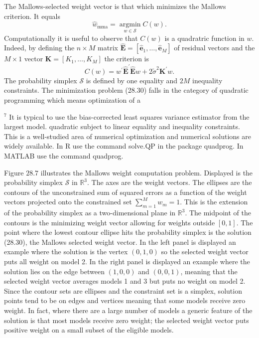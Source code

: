 \documentclass[10pt]{article}
\begin{document}
The Mallows-selected weight vector is that which minimizes the Mallows criterion. It equals
$$
\widehat{w}_{\mathrm{mma}}=\underset{w \in \mathscr{S}}{\operatorname{argmin}} C(w) .
$$
Computationally it is useful to observe that $C(w)$ is a quadratric function in $w$. Indeed, by defining the $n \times M$ matrix $\widehat{\boldsymbol{E}}=\left[\widehat{\boldsymbol{e}}_{1}, \ldots, \widehat{\boldsymbol{e}}_{M}\right]$ of residual vectors and the $M \times 1$ vector $\boldsymbol{K}=\left[K_{1}, \ldots, K_{M}\right]$ the criterion is
$$
C(w)=w^{\prime} \widehat{\boldsymbol{E}}^{\prime} \widehat{\boldsymbol{E}} w+2 \widetilde{\sigma}^{2} \boldsymbol{K}^{\prime} w .
$$
The probability simplex $\mathscr{S}$ is defined by one equality and $2 M$ inequality constraints. The minimization problem (28.30) falls in the category of quadratic programming which means optimization of a

${ }^{7}$ It is typical to use the bias-corrected least squares variance estimator from the largest model. quadratic subject to linear equality and inequality constraints. This is a well-studied area of numerical optimization and numerical solutions are widely available. In R use the command solve.QP in the package quadprog. In MATLAB use the command quadprog.

Figure $28.7$ illustrates the Mallows weight computation problem. Displayed is the probability simplex $\mathscr{S}$ in $\mathbb{R}^{3}$. The axes are the weight vectors. The ellipses are the contours of the unconstrained sum of squared errors as a function of the weight vectors projected onto the constrained set $\sum_{m=1}^{M} w_{m}=1$. This is the extension of the probability simplex as a two-dimensional plane in $\mathbb{R}^{3}$. The midpoint of the contours is the minimizing weight vector allowing for weights outside $[0,1]$. The point where the lowest contour ellipse hits the probability simplex is the solution (28.30), the Mallows selected weight vector. In the left panel is displayed an example where the solution is the vertex $(0,1,0)$ so the selected weight vector puts all weight on model 2. In the right panel is displayed an example where the solution lies on the edge between $(1,0,0)$ and $(0,0,1)$, meaning that the selected weight vector averages models 1 and 3 but puts no weight on model 2. Since the contour sets are ellipses and the constraint set is a simplex, solution points tend to be on edges and vertices meaning that some models receive zero weight. In fact, where there are a large number of models a generic feature of the solution is that most models receive zero weight; the selected weight vector puts positive weight on a small subset of the eligible models.\\
\end{document}
